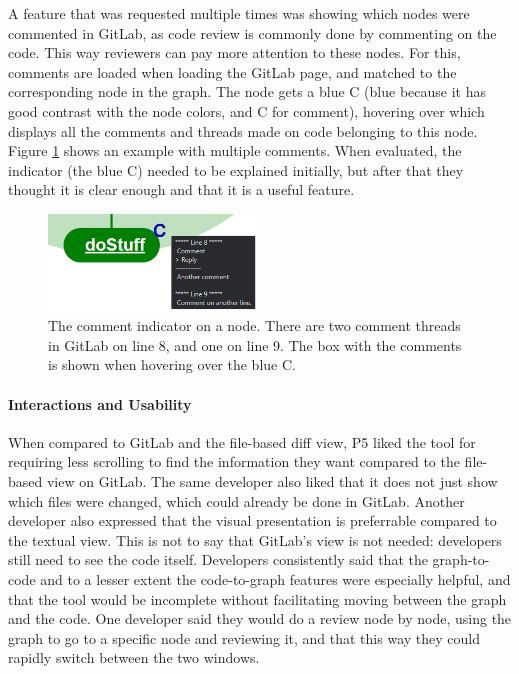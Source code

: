 \documentclass[a4paper,11pt,twoside]{article}
\theoremstyle{definition} %
\begin{document}
A feature that was requested multiple times was showing which nodes were commented in GitLab, as code review is commonly done by commenting on the code. This way reviewers can pay more attention to these nodes. For this, comments are loaded when loading the GitLab page, and matched to the corresponding node in the graph. The node gets a blue C (blue because it has good contrast with the node colors, and C for comment), hovering over which displays all the comments and threads made on code belonging to this node. Figure \ref{fig:CommentIndicator} shows an example with multiple comments. When evaluated, the indicator (the blue C) needed to be explained initially, but after that they thought it is clear enough and that it is a useful feature. 

\begin{figure}[h!]
    \centering
    \includegraphics[width=0.5\textwidth]{Subfigures/comment_indicator.PNG}
    \caption{The comment indicator on a node. There are two comment threads in GitLab on line 8, and one on line 9. The box with the comments is shown when hovering over the blue C.}
    \label{fig:CommentIndicator}
\end{figure}


\paragraph{Interactions and Usability} \label{Par:InteractionsUsability}

When compared to GitLab and the file-based diff view, P5 liked the tool for requiring less scrolling to find the information they want compared to the file-based view on GitLab. The same developer also liked that it does not just show which files were changed, which could already be done in GitLab. Another developer also expressed that the visual presentation is preferrable compared to the textual view. This is not to say that GitLab’s view is not needed: developers still need to see the code itself. Developers consistently said that the graph-to-code and to a lesser extent the code-to-graph features were especially helpful, and that the tool would be incomplete without facilitating moving between the graph and the code. One developer said they would do a review node by node, using the graph to go to a specific node and reviewing it, and that this way they could rapidly switch between the two windows. 
\end{document}
